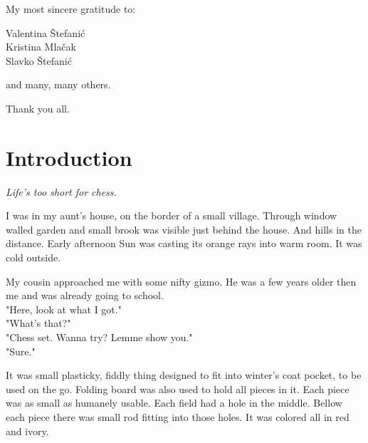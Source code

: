 \documentclass[a5paper,12pt,draft]{book} %
\begin{document}
\thispagestyle{empty}
\vspace*{0.2\textheight}
\begin{flushright}
My most sincere gratitude to:

Valentina Štefanić \\
Kristina Mlačak \\
Slavko Štefanić

and many, many others.

Thank you all.
\end{flushright}
\clearpage

\thispagestyle{empty}
\vspace*{0.1\textheight}
\clearpage

\chapter*{Introduction}

\begin{flushright}
\parbox{0.6\textwidth}{
\emph{Life's too short for chess. \\
 } }
\end{flushright}

\noindent
I was in my aunt's house, on the border of a small village.
Through window walled garden and small brook was visible just
behind the house. And hills in the distance. Early afternoon Sun
was casting its orange rays into warm room. It was cold outside.

My cousin approached me with some nifty gizmo. He was a
few years older then me and was already going to school. \\
"Here, look at what I got." \\
"What's that?" \\
"Chess set. Wanna try? Lemme show you." \\
"Sure."

It was small plasticky, fiddly thing designed to fit into winter's
coat pocket, to be used on the go. Folding board was also used to
hold all pieces in it. Each piece was as small as humanely usable.
Each field had a hole in the middle. Bellow each piece there was
small rod fitting into those holes. It was colored all in red and ivory.
\end{document}
